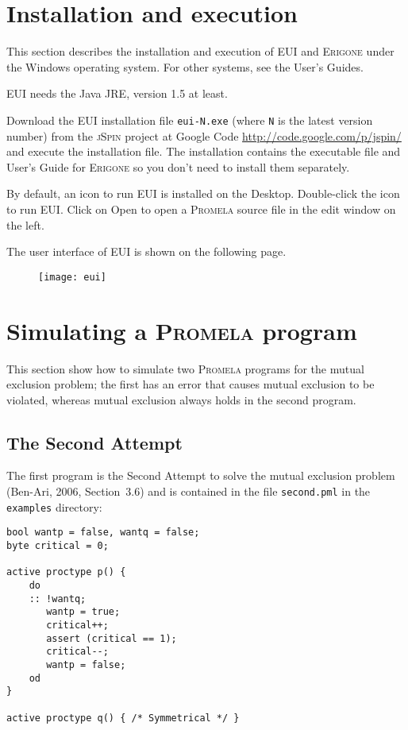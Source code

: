 \documentclass[11pt]{article}
\newcommand*{\prg}{\textsc{Erigone}}
\newcommand*{\eui}{\textsc{EUI}}
\newcommand*{\jsp}{\textsc{jSpin}}
\newcommand*{\prm}{\textsc{Promela}}
\newcommand*{\p}[1]{\texttt{#1}}
\newcommand*{\bu}[1]{\textsf{#1}}
\begin{document}
\section{Installation and execution}

This section describes the installation and execution of \eui{} and \prg{}
under the Windows operating system. For other systems, see the User's Guides.

\eui{} needs the Java JRE, version 1.5 at least. 

Download the \eui{} installation file \p{eui-N.exe} (where \p{N} is the
latest version number) from the \jsp{} project at Google Code
\url{http://code.google.com/p/jspin/} and execute the installation file.
The installation contains the executable file and User's Guide for
\prg{} so you don't need to install them separately.

By default, an icon to run \eui{} is installed on the Desktop.
Double-click the icon to run \eui{}. Click on \bu{Open} to open a \prm{}
source file in the edit window on the left.

The user interface of \eui{} is shown on the following page.

\begin{figure}[tb]
\begin{center}
\texttt{[image: eui]}
\end{center}
\end{figure}


\section{Simulating a \prm{} program}

This section show how to simulate two \prm{} programs for the mutual
exclusion problem; the first has an error that causes mutual exclusion
to be violated, whereas mutual exclusion always holds in the second
program.

\subsection*{The Second Attempt}

The first program is the Second Attempt to solve the mutual
exclusion problem (Ben-Ari, 2006, Section~3.6) and is contained in
the file \p{second.pml} in the \p{examples} directory:

\begin{verbatim}
bool wantp = false, wantq = false;
byte critical = 0; 

active proctype p() {
    do 
    :: !wantq;
       wantp = true;
       critical++;
       assert (critical == 1);
       critical--;
       wantp = false;
    od
}

active proctype q() { /* Symmetrical */ }
\end{verbatim}
\end{document}
